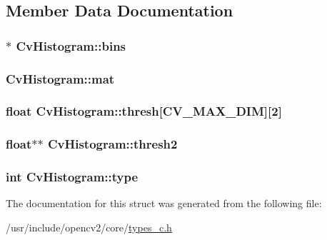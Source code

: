 \subsection{Member Data Documentation}
\hypertarget{structCvHistogram_a0e35427a99b709c43c92e8c8bb8a3019}{
\subsubsection[{bins}]{$\ast$ Cv\-Histogram\-::bins}}\label{structCvHistogram_a0e35427a99b709c43c92e8c8bb8a3019}
\hypertarget{structCvHistogram_a363eff76e137cbf655a4f6d50b55a6f6}{
\subsubsection[{mat}]{ Cv\-Histogram\-::mat}}\label{structCvHistogram_a363eff76e137cbf655a4f6d50b55a6f6}
\hypertarget{structCvHistogram_a9df34c3db55a11ae8c96a1d87b41a5a6}{
\subsubsection[{thresh}]{\setlength{\rightskip}{0pt plus 5cm}float Cv\-Histogram\-::thresh\mbox{[}{\bf C\-V\-\_\-\-M\-A\-X\-\_\-\-D\-I\-M}\mbox{]}\mbox{[}2\mbox{]}}}\label{structCvHistogram_a9df34c3db55a11ae8c96a1d87b41a5a6}
\hypertarget{structCvHistogram_a54078c0f947e41860cdd9139beed48df}{
\subsubsection[{thresh2}]{\setlength{\rightskip}{0pt plus 5cm}float$\ast$$\ast$ Cv\-Histogram\-::thresh2}}\label{structCvHistogram_a54078c0f947e41860cdd9139beed48df}
\hypertarget{structCvHistogram_a7756d84a7aac81bd6bde2e5f5b70bc04}{
\subsubsection[{type}]{\setlength{\rightskip}{0pt plus 5cm}int Cv\-Histogram\-::type}}\label{structCvHistogram_a7756d84a7aac81bd6bde2e5f5b70bc04}


The documentation for this struct was generated from the following file\-:\begin{DoxyCompactItemize}
\item 
/usr/include/opencv2/core/\hyperlink{core_2types__c_8h}{types\-\_\-c.\-h}\end{DoxyCompactItemize}
